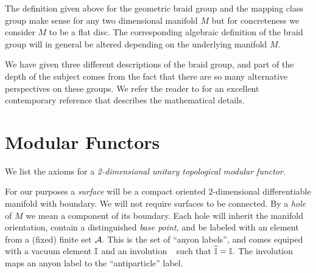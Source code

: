 \documentclass[aps, prl, letterpaper, twocolumn, superscriptaddress, notitlepage, 10pt]{revtex4-1}
\begin{document}
The definition given above for the geometric braid group
and the mapping class group make sense for any two dimensional
manifold $M$ but for concreteness we consider $M$ to be
a flat disc. The corresponding algebraic definition of the braid group
will in general be altered depending on the underlying manifold
$M.$

We have given three different descriptions of the braid group, and
part of the depth of the subject comes from the fact that there are
so many alternative perspectives on these groups. We refer
the reader to \cite{Kassel2010} for an excellent contemporary
reference that describes the mathematical details.



\section{Modular Functors}

We list the axioms for a 
\emph{2-dimensional unitary topological modular functor}.

For our purposes a \emph{surface} will be a compact
oriented $2$-dimensional differentiable manifold with boundary. %
We will not require surfaces to be connected.
By a \emph{hole} of $M$ we mean a component of its boundary. %
Each hole will inherit the manifold orientation,
contain a distinguished \emph{base point},
and be labeled with
an element from a (fixed) finite set $\mathcal{A}.$
This is the set of ``anyon labels'', and comes
equiped with a vacuum element $\mathbb{I}$ 
and an involution $\ \widehat{}\ $ such that $\widehat{\mathbb{I}}=\mathbb{I}.$
The involution maps an anyon label to the ``antiparticle'' label.
\end{document}
